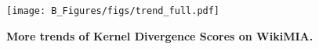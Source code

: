 
\begin{figure}[h]
    \begin{center}
    \texttt{[image: B\_Figures/figs/trend\_full.pdf]}
    \end{center}
    \vspace{-3mm}
    \caption{\textbf{More trends of Kernel Divergence Scores on WikiMIA.}}
\label{fig:trend}
\end{figure}